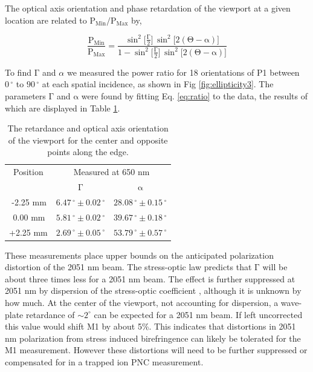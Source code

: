 \documentclass[%
 reprint,
 amsmath,amssymb,
 aps,
]{revtex4-1}
\begin{document}
\indent The optical axis orientation and phase retardation of the viewport at a given location are related to $\mathrm{P_{Min}} / \mathrm{P_{Max}}$ by,

\begin{equation}\label{eq:ratio}
\frac{\mathrm{P_{Min}}}{\mathrm{P_{Max}}} =\frac{\mathrm{\sin}^2\big[\frac{\mathrm{\Gamma}}{2}\big] \,\mathrm{\sin}^2\big[2(\mathrm{\Theta}-\mathrm{\alpha})\big]}{1-\mathrm{\sin}^2\big[\frac{\mathrm{\Gamma}}{2}\big]\, \mathrm{\sin}^2\big[2(\mathrm{\Theta}-\mathrm{\alpha})\big]}
\end{equation} 

\noindent To find $\mathrm{\Gamma}$ and $\alpha$ we measured the power ratio for 18 orientations of P1 between $0\,^{\circ}$ to $90\,^{\circ}$ at each spatial incidence, as shown in Fig \ref{fig:ellipticity3}.  The parameters $\mathrm{\Gamma}$ and $\mathrm{\alpha}$ were found by fitting Eq. \ref{eq:ratio} to the data, the results of which are displayed in Table \ref{tab:fit}.

\begin{table}[ht]
\centering
\begin{tabular}{|c|c|c|}
\hline
Position&\multicolumn{2}{c|}{Measured at 650 nm}\\ 
&$\mathrm{\Gamma}$&$\mathrm{\alpha}$ \\
\hline
 \;\,-2.25 mm& $6.47\,^{\circ} \pm 0.02\,^{\circ}$ & $28.08\,^{\circ} \pm 0.15\,^{\circ}$ \\ [1ex]
 \;\;\,0.00 mm& $5.81\,^{\circ} \pm 0.02\,^{\circ}$ & $39.67\,^{\circ} \pm 0.18\,^{\circ}$ \\ [1ex]
+2.25 mm & $2.69\,^{\circ} \pm 0.05\,^{\circ}$ & $53.79\,^{\circ} \pm 0.57\,^{\circ}$ \\ [1ex]
\hline
\end{tabular}
\caption {The retardance and optical axis orientation of the viewport for the center and opposite points along the edge.}
 \label{tab:fit} 
\end{table}

\indent  These measurements place upper bounds on the anticipated polarization distortion of the 2051 nm beam.  The stress-optic law predicts that $\mathrm{\Gamma}$ will be about three times less for a 2051 nm beam.  The effect is further suppressed at 2051 nm by dispersion of the stress-optic coefficient \cite{Vasudevan72}, although it is unknown by how much.  At the center of the viewport, not accounting for dispersion, a wave-plate retardance of $\sim 2^{\circ}$ can be expected for a 2051 nm beam.  If left uncorrected this value would shift M1 by about 5\%.  This indicates that distortions in 2051 nm polarization from stress induced birefringence can likely be tolerated for the M1 measurement.  However these distortions will need to be further suppressed or compensated for in a trapped ion PNC measurement.    
\end{document}
